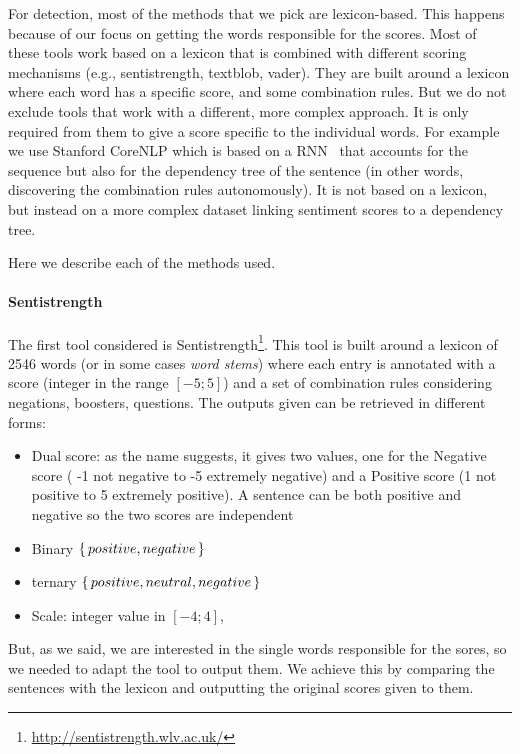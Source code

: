 For detection, most of the methods that we pick are lexicon-based. This happens because of our focus on getting the words responsible for the scores. Most of these tools work based on a lexicon that is combined with different scoring mechanisms (e.g., sentistrength, textblob, vader). They are built around a lexicon where each word has a specific score, and some combination rules. But we do not exclude tools that work with a different, more complex approach. It is only required from them to give a score specific to the individual words. For example we use Stanford CoreNLP which is based on a RNN~\citep{socher2013recursive} that accounts for the sequence but also for the dependency tree of the sentence (in other words, discovering the combination rules autonomously). It is not based on a lexicon, but instead on a more complex dataset linking sentiment scores to a dependency tree.

Here we describe each of the methods used.

\paragraph{Sentistrength}
The first tool considered is Sentistrength\footnote{\url{http://sentistrength.wlv.ac.uk/}}. This tool is built around a lexicon of 2546 words (or in some cases \emph{word stems}) where each entry is annotated with a score (integer in the range $[-5;5]$) and a set of combination rules considering negations, boosters, questions. The outputs given can be retrieved in different forms:
\begin{itemize}
    \item Dual score: as the name suggests, it gives two values, one for the Negative score ( -1 not negative to -5 extremely negative) and a Positive score (1 not positive to 5 extremely positive). A sentence can be both positive and negative so the two scores are independent
    \item Binary $\set{positive, negative}$
    \item ternary $\set{positive, neutral, negative}$
    \item Scale: integer value in $[-4;4]$,
\end{itemize}

But, as we said, we are interested in the single words responsible for the sores, so we needed to adapt the tool to output them. We achieve this by comparing the sentences with the lexicon and outputting the original scores given to them.


